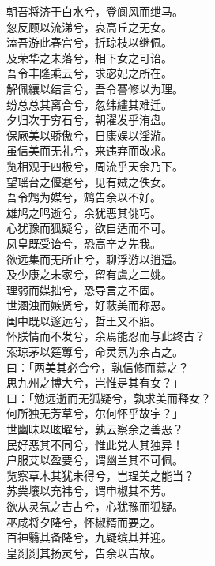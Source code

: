 \documentclass[]{article}
\begin{document}
朝吾将济于白水兮，登阆风而绁马。\\
忽反顾以流涕兮，哀高丘之无女。\\
溘吾游此春宫兮，折琼枝以继佩。\\
及荣华之未落兮，相下女之可诒。\\
吾令丰隆乘云兮，求宓妃之所在。\\
解佩纕以结言兮，吾令謇修以为理。\\
纷总总其离合兮，忽纬繣其难迁。\\
夕归次于穷石兮，朝濯发乎洧盘。\\
保厥美以骄傲兮，日康娱以淫游。\\
虽信美而无礼兮，来违弃而改求。\\
览相观于四极兮，周流乎天余乃下。\\
望瑶台之偃蹇兮，见有娀之佚女。\\
吾令鸩为媒兮，鸩告余以不好。\\
雄鸠之鸣逝兮，余犹恶其佻巧。\\
心犹豫而狐疑兮，欲自适而不可。\\
凤皇既受诒兮，恐高辛之先我。\\
欲远集而无所止兮，聊浮游以逍遥。\\
及少康之未家兮，留有虞之二姚。\\
理弱而媒拙兮，恐导言之不固。\\
世溷浊而嫉贤兮，好蔽美而称恶。\\
闺中既以邃远兮，哲王又不寤。\\
怀朕情而不发兮，余焉能忍而与此终古？\\
索琼茅以筳篿兮，命灵氛为余占之。\\
曰：「两美其必合兮，孰信修而慕之？\\
思九州之博大兮，岂惟是其有女？」\\
曰：「勉远逝而无狐疑兮，孰求美而释女？\\
何所独无芳草兮，尔何怀乎故宇？」\\
世幽昧以昡曜兮，孰云察余之善恶？\\
民好恶其不同兮，惟此党人其独异！\\
户服艾以盈要兮，谓幽兰其不可佩。\\
览察草木其犹未得兮，岂珵美之能当？\\
苏粪壤以充祎兮，谓申椒其不芳。\\
欲从灵氛之吉占兮，心犹豫而狐疑。\\
巫咸将夕降兮，怀椒糈而要之。\\
百神翳其备降兮，九疑缤其并迎。\\
皇剡剡其扬灵兮，告余以吉故。\\
\end{document}
